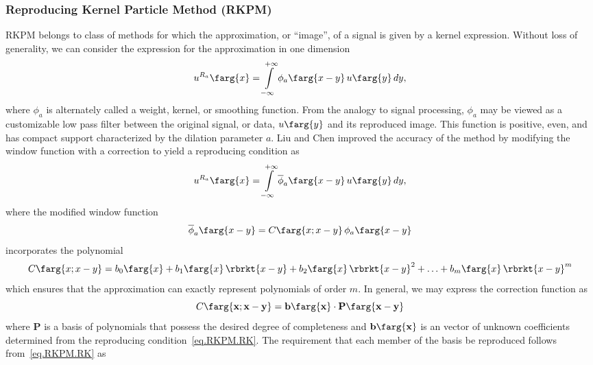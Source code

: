 \subsubsection{Reproducing Kernel Particle Method (RKPM)}
\label{section.RKPM}
RKPM belongs to class of methods for which the
approximation, or ``image'', of a signal is given by a kernel 
expression. Without loss of generality, we can consider the 
expression for the approximation in one dimension
\begin{equation}
u^{R_{a}}\farg{x} = \int \limits_{-\infty}^{+\infty}
    \phi_{a}\farg{x-y}\,u\farg{y}\,dy,
\end{equation}
where $\phi_{a}$ is alternately called a weight, kernel, or smoothing 
function. From the analogy to signal processing, 
$\phi_{a}$ may be viewed as a customizable low pass filter between 
the original signal, or data, $u\farg{y}$ and its reproduced image.
This function is positive, even, and has compact support characterized
by the dilation parameter $a$. Liu and Chen\cite{Liu1995a} improved the
accuracy of the method by modifying the window function with a
correction to yield a reproducing condition as
\begin{equation}
\label{eq.RKPM.RK}
u^{R_{a}}\farg{x} = \int \limits_{-\infty}^{+\infty}
    \overline{\phi}_{a}\farg{x-y}\,u\farg{y}\,dy,
\end{equation}
where the modified window function
\begin{equation}
\overline{\phi}_{a}\farg{x-y} = C\farg{x; x-y}\,\phi_{a}\farg{x-y}
\end{equation}
incorporates the polynomial
\begin{equation}
C\farg{x; x-y} = b_{0}\farg{x} +
    b_{1}\farg{x}\,\rbrkt{x-y} +
    b_{2}\farg{x}\,\rbrkt{x-y}^{2} + \ldots +
    b_{m}\farg{x}\,\rbrkt{x-y}^{m}
\end{equation}
which ensures that the approximation can exactly represent
polynomials of order $m$. In general,
we may express the correction function as
\begin{equation}
C\farg{\mathbf{x}; \mathbf{x}-\mathbf{y}} =     
    \mathbf{b}\farg{\mathbf{x}}\cdot
    \mathbf{P}\farg{\mathbf{x}-\mathbf{y}}
\end{equation}
where $\mathbf{P}$ is a basis of polynomials
that possess the desired degree of completeness and 
$\mathbf{b}\farg{\mathbf{x}}$ is an vector of unknown
coefficients determined from the reproducing condition~\eqref{eq.RKPM.RK}.
The requirement that each member of the basis be reproduced
follows from~\eqref{eq.RKPM.RK} as
